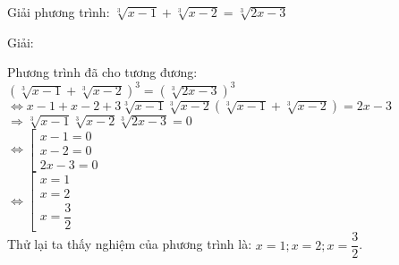 \begin{vd}
    Giải phương trình: $ \sqrt[3]{x-1}+\sqrt[3]{x-2} = \sqrt[3]{2x-3}$
\end{vd}
\begin{center}
    Giải:
\end{center}

Phương trình đã cho tương đương: \\
$ \left( \sqrt[3]{x-1}+\sqrt[3]{x-2} \right)^3 = \left( \sqrt[3]{2x-3 } \right)^3 $\\ 
$ \Leftrightarrow x -1 + x -2 + 3 \sqrt[3]{x-1}\sqrt[3]{x-2}\left(  \sqrt[3]{x-1}+\sqrt[3]{x-2}\right) = 2x -3 $ \\
$ \Rightarrow   \sqrt[3]{x-1}\sqrt[3]{x-2}  \sqrt[3]{2x-3} =0 $ \\
$ \Leftrightarrow \left[
    \begin{array}{l}
        x-1 =0 \\
        x-2 =0 \\
        2x -3 =0
    \end{array}
\right. $ \\
$ \Leftrightarrow \left[
    \begin{array}{l}
        x=1 \\ x=2 \\ x= \dfrac{3}{2}
    \end{array}
\right. $ \\
Thử lại ta thấy nghiệm của phương trình là: $ x=1; x=2 ; x=\dfrac{3}{2}$.


